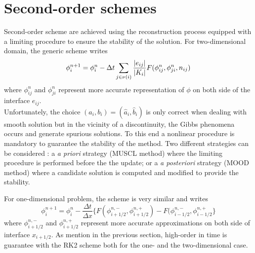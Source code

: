 \section{Second-order schemes}
\label{sec:400}

Second-order scheme are achieved using the reconstruction process equipped with a limiting procedure
to ensure the stability of the solution. For two-dimensional domain, the generic scheme writes
$$
\phi_i^{n+1} = \phi_i^n - \Delta{t} \sum_{j \in \nu(i)} {|e_{ij}| \over |K_i|} 
F(\phi_{ij}^n, \phi_{ji}^n, n_{ij}) 
$$
where $\phi_{ij}^n$ and $\phi_{ji}^n$ represent more accurate representation of $\phi$ on both
side of the interface $e_{ij}$.\\
Unfortunately, the choice $(a_i,b_i)=(\widehat a_i,\widehat b_i)$ is only correct when dealing
with smooth solution but in the vicinity of a discontinuity, the Gibbs phenomena occurs
and generate spurious solutions. To this end a nonlinear procedure is mandatory to guarantee
the stability of the method. 
Two different strategies can be considered : a {\it a priori} strategy (MUSCL method)
where the limiting procedure is performed before the the update; or a {\it a posteriori} strategy 
(MOOD method) where a candidate solution is computed and modified to provide the stability.

For one-dimensional problem, the scheme is very similar and writes
$$
\phi_i^{n+1}=\phi_i^{n}-\frac{\Delta t}{\Delta x}\Big \{
F(\phi^{n,-}_{i+1/2},\phi^{n,+}_{i+1/2})-F(\phi^{n,-}_{i-1/2},\phi^{n,+}_{i-1/2} \Big \}
$$
where $\phi^{n,-}_{i+1/2}$ and $\phi^{n,+}_{i+1/2}$ represent more accurate approximations
on both side of interface $x_{i+1/2}$.
As mention in the previous section, high-order in time is guarantee with the RK2 scheme both for the
one- and the two-dimensional case.

